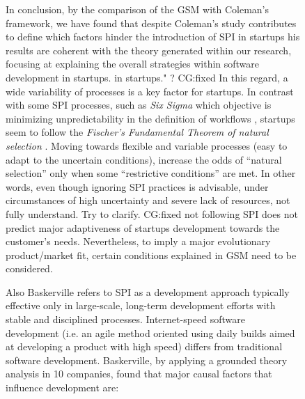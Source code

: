\documentclass[12pt,journal,compsoc]{../sty/IEEEtran}
\begin{document}
\begin{table}[!t]
\begin{figure}[!t]
\begin{compactitem}
In conclusion, by the comparison of the GSM with Coleman's framework, we have
found that despite Coleman's study contributes to define which factors hinder
the introduction of SPI in startups  %
his results are coherent with the theory generated within our research, focusing
at explaining the overall strategies within software development in startups.
in startups." ? CG:fixed In this regard, a wide variability of processes is a
key factor for startups.   In contrast with some SPI processes, such as
\textit{Six Sigma} which objective  is minimizing unpredictability in the
definition of workflows \cite{Sixsigma},  startups seem to follow the
\textit{Fischer's Fundamental Theorem of natural   selection} \cite{Fisher}.
Moving towards flexible and variable processes (easy  to adapt to the uncertain
conditions), increase the odds of ``natural  selection'' only when some
``restrictive conditions'' are met. In other words, even though ignoring SPI
practices is advisable, under circumstances of high uncertainty and severe lack
of resources, %
not fully understand. Try to clarify. CG:fixed   not following SPI does not
predict major adaptiveness of startups development towards the customer's needs.
Nevertheless, to imply a major evolutionary product/market fit, certain
conditions explained in GSM need to be considered.



Also Baskerville \cite{Internet} refers to SPI as a development approach
typically effective only in large-scale, long-term development efforts with
stable and disciplined processes. Internet-speed software development (i.e. an
agile method oriented using daily builds aimed at developing a product with high
speed) differs from traditional software development. Baskerville, by applying a
grounded theory analysis in 10 companies, found that major causal factors that
influence development are:



\end{compactitem}
\end{figure}
\end{table}
\end{document}
